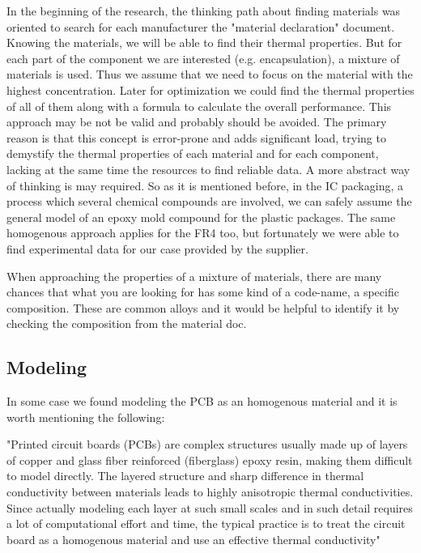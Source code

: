 \documentclass[final]{cubedoc}
\begin{document}
	In the beginning of the research, the thinking path about finding materials was oriented to search for each manufacturer the "material declaration" document. Knowing the materials, we will be able to find their thermal properties. But for each part of the component we are interested (e.g. encapsulation), a mixture of materials is used. Thus we assume that we need to focus on the material with the highest concentration. Later for optimization we could find the thermal properties of all of them along with a formula to calculate the overall performance. This approach may be not be valid and probably should be avoided. The primary reason is that this concept is error-prone and adds significant load, trying to demystify the thermal properties of each material and for each component, lacking at the same time the resources to find reliable data. A more abstract way of thinking is may required. So as it is mentioned before, in the IC packaging, a process which several chemical compounds are involved, we can safely assume the general model of an epoxy mold compound for the plastic packages. The same homogenous approach applies for the FR4 too, but fortunately we were able to find experimental data for our case provided by the supplier.
	
	
	
	When approaching the properties of a mixture of materials, there are many chances that what you are looking for has some kind of a code-name, a specific composition. These are common alloys and it would be helpful to identify it by checking the composition from the material doc. 
	
	
	\subsection{Modeling}
	\label{subsec:modeling}
	
	
	In some case we found modeling the PCB as an homogenous material and it is worth mentioning the following:
	
	
	"Printed circuit boards (PCBs) are complex structures usually made up of layers of copper and glass fiber reinforced (fiberglass) epoxy resin, making them difficult to model directly. The layered structure and sharp difference in thermal conductivity between materials leads to highly anisotropic thermal conductivities. Since actually modeling each layer at such small scales and in such detail requires a lot of computational effort and time, the typical practice is to treat the circuit board as a homogenous material and use an effective thermal conductivity" \cite{peake2014cubesat}
	
\end{document}
